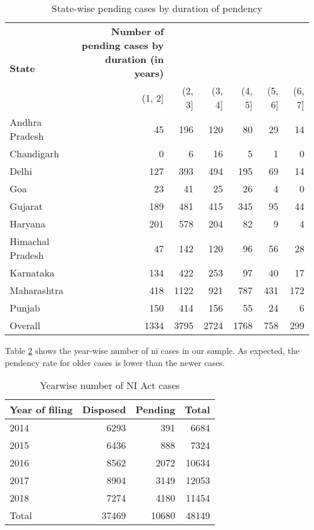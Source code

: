 \begin{longtable}{@{}lrrrrrr@{}}
    \caption{State-wise pending cases by duration of pendency}\label{tab:state_pending}\\
\toprule
\multirow{2}{*}{\textbf{State}} &  \textbf{Number of pending cases by duration (in years)} \\
\cmidrule{2-7}
 &  (1, 2] &  (2, 3] &  (3, 4] &  (4, 5] &  (5, 6] &  (6, 7] \\
\midrule
\endhead
Andhra Pradesh   &      45 &     196 &     120 &      80 &      29 &      14 \\
Chandigarh       &       0 &       6 &      16 &       5 &       1 &       0 \\
Delhi            &     127 &     393 &     494 &     195 &      69 &      14 \\
Goa              &      23 &      41 &      25 &      26 &       4 &       0 \\
Gujarat          &     189 &     481 &     415 &     345 &      95 &      44 \\
Haryana          &     201 &     578 &     204 &      82 &       9 &       4 \\
Himachal Pradesh &      47 &     142 &     120 &      96 &      56 &      28 \\
Karnataka        &     134 &     422 &     253 &      97 &      40 &      17 \\
Maharashtra      &     418 &    1122 &     921 &     787 &     431 &     172 \\
Punjab           &     150 &     414 &     156 &      55 &      24 &       6 \\
\midrule
Overall & 1334 & 3795 & 2724 & 1768 & 758 & 299 \\
\bottomrule
\end{longtable}

Table \ref{tab:yearWise_ni} shows the year-wise number of \gls{ni} cases in our sample. As expected, the pendency rate for older cases is lower than the newer cases.

\begin{longtable}[h!]{@{}lrrr@{}}
  \caption{Yearwise number of NI Act cases}\label{tab:yearWise_ni}\\
\toprule
\textbf{Year of filing} &  \textbf{Disposed} &  \textbf{Pending} &  \textbf{Total} \\
\midrule\endhead
2014  &      6293 &      391 &   6684 \\
2015  &      6436 &      888 &   7324 \\
2016  &      8562 &     2072 &  10634 \\
2017  &      8904 &     3149 &  12053 \\
2018  &      7274 &     4180 &  11454 \\
\midrule
Total &     37469 &    10680 &  48149 \\
\bottomrule
\end{longtable}

